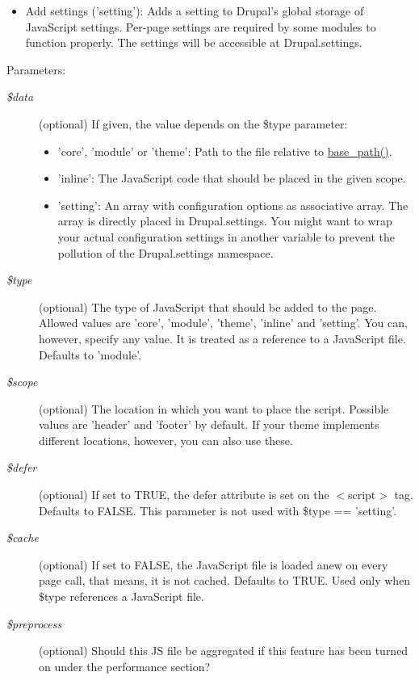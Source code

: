 \begin{itemize}
\item Add settings ('setting'): Adds a setting to Drupal's global storage of JavaScript settings. Per-page settings are required by some modules to function properly. The settings will be accessible at Drupal.settings.\end{itemize}


\begin{Desc}
\item[Parameters:]
\begin{description}
\item[{\em \$data}](optional) If given, the value depends on the \$type parameter:\begin{itemize}
\item 'core', 'module' or 'theme': Path to the file relative to \hyperlink{common_8inc_e227697e9c239f09fd7e36f71afde771}{base\_\-path()}.\item 'inline': The JavaScript code that should be placed in the given scope.\item 'setting': An array with configuration options as associative array. The array is directly placed in Drupal.settings. You might want to wrap your actual configuration settings in another variable to prevent the pollution of the Drupal.settings namespace. \end{itemize}
\item[{\em \$type}](optional) The type of JavaScript that should be added to the page. Allowed values are 'core', 'module', 'theme', 'inline' and 'setting'. You can, however, specify any value. It is treated as a reference to a JavaScript file. Defaults to 'module'. \item[{\em \$scope}](optional) The location in which you want to place the script. Possible values are 'header' and 'footer' by default. If your theme implements different locations, however, you can also use these. \item[{\em \$defer}](optional) If set to TRUE, the defer attribute is set on the $<$script$>$ tag. Defaults to FALSE. This parameter is not used with \$type == 'setting'. \item[{\em \$cache}](optional) If set to FALSE, the JavaScript file is loaded anew on every page call, that means, it is not cached. Defaults to TRUE. Used only when \$type references a JavaScript file. \item[{\em \$preprocess}](optional) Should this JS file be aggregated if this feature has been turned on under the performance section? \end{description}
\end{Desc}
